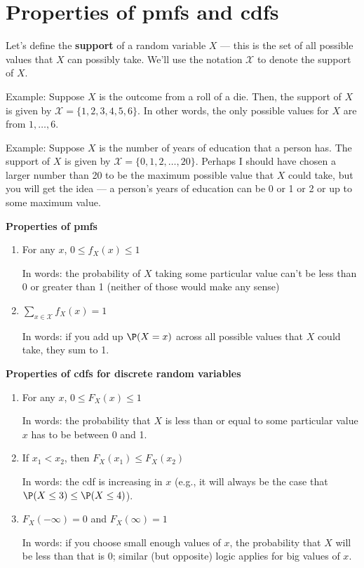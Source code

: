 \documentclass[
  letterpaper,
  DIV=11,
  numbers=noendperiod]{scrreprt}
\begin{document}
\section{Properties of pmfs and cdfs}\label{properties-of-pmfs-and-cdfs}

Let's define the \textbf{support} of a random variable \(X\) --- this is
the set of all possible values that \(X\) can possibly take. We'll use
the notation \(\mathcal{X}\) to denote the support of \(X\).

{Example: }Suppose \(X\) is the outcome from a roll of a die. Then, the
support of \(X\) is given by \(\mathcal{X} = \{1,2,3,4,5,6\}\). In other
words, the only possible values for \(X\) are from \(1,\ldots,6\).

{Example: }Suppose \(X\) is the number of years of education that a
person has. The support of \(X\) is given by
\(\mathcal{X} = \{0, 1, 2, \ldots, 20\}\). Perhaps I should have chosen
a larger number than 20 to be the maximum possible value that \(X\)
could take, but you will get the idea --- a person's years of education
can be 0 or 1 or 2 or up to some maximum value.

\textbf{Properties of pmfs}

\begin{enumerate}
\def\labelenumi{\arabic{enumi}.}
\item
  For any \(x\), \(0 \leq f_X(x) \leq 1\)

  In words: the probability of \(X\) taking some particular value can't
  be less than 0 or greater than 1 (neither of those would make any
  sense)
\item
  \(\sum_{x \in \mathcal{X}} f_X(x) = 1\)

  In words: if you add up \(\P(X=x)\) across all possible values that
  \(X\) could take, they sum to 1.
\end{enumerate}

\textbf{Properties of cdfs for discrete random variables}

\begin{enumerate}
\def\labelenumi{\arabic{enumi}.}
\item
  For any \(x\), \(0 \leq F_X(x) \leq 1\)

  In words: the probability that \(X\) is less than or equal to some
  particular value \(x\) has to be between 0 and 1.
\item
  If \(x_1 < x_2\), then \(F_X(x_1) \leq F_X(x_2)\)

  In words: the cdf is increasing in \(x\) (e.g., it will always be the
  case that \(\P(X \leq 3) \leq \P(X \leq 4)\)).
\item
  \(F_X(-\infty)=0\) and \(F_X(\infty)=1\)

  In words: if you choose small enough values of \(x\), the probability
  that \(X\) will be less than that is 0; similar (but opposite) logic
  applies for big values of \(x\).
\end{enumerate}
\end{document}
